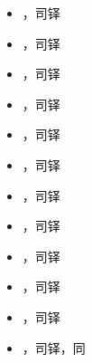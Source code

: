 \begin{itemize}
\item {}，司铎
\end{itemize}

\begin{itemize}
\item {}，司铎
\end{itemize}

\begin{itemize}
\item {}，司铎
\end{itemize}

\begin{itemize}
\item {}，司铎
\end{itemize}

\begin{itemize}
\item {}，司铎
\end{itemize}

\begin{itemize}
\item {}，司铎
\end{itemize}

\begin{itemize}
\item {}，司铎
\end{itemize}

\begin{itemize}
\item {}，司铎
\end{itemize}

\begin{itemize}
\item {}，司铎
\end{itemize}

\begin{itemize}
\item {}，司铎
\end{itemize}

\begin{itemize}
\item {}，司铎
\end{itemize}

\begin{itemize}
\item {}，司铎，同
\end{itemize}

